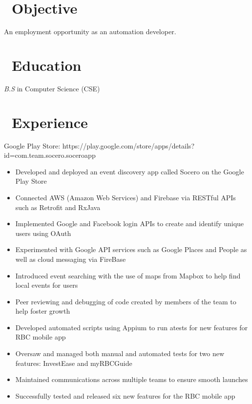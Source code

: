 \documentclass{resume}
\begin{document}



\section{\faSearch\ Objective}
An employment opportunity as an automation developer.

\section{\faGraduationCap\ Education}
\textit{B.S} in Computer Science (CSE)

\section{\faUsers\ Experience}
\role{Android Developer}

Google Play Store: {\color{blue}https://play.google.com/store/apps/details?id=com.team.socero.soceroapp}
\begin{itemize}
  \item Developed and deployed an event discovery app called Socero on the Google Play Store 
  \item Connected AWS (Amazon Web Services) and Firebase via RESTful APIs such as Retrofit and RxJava
  \item Implemented Google and Facebook login APIs to create and identify unique users using OAuth
  \item Experimented with Google API services such as Google Places and People as well as cloud messaging via FireBase
  \item Introduced event searching with the use of maps from Mapbox to help find local events for users
  \item Peer reviewing and debugging of code created by members of the team to help foster growth
\end{itemize}

\begin{itemize}
  \item Developed automated scripts using Appium to run atests for new features for RBC mobile app
  \item Oversaw and managed both manual and automated tests for two new features: InvestEase and myRBCGuide
  \item Maintained communications across multiple teams to ensure smooth launches
  \item Successfully tested and released six new features for the RBC mobile app
\end{itemize}
\end{document}
